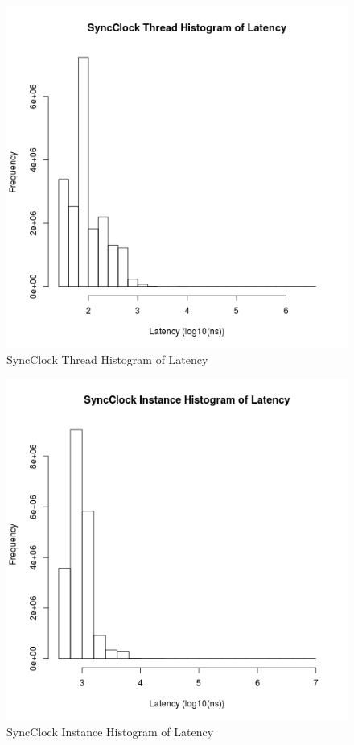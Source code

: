 \begin{figure}[H]
\center
\includegraphics[height=.4\textheight]{sync_thread_latency_hist.png}
\caption{SyncClock Thread Histogram of Latency}
\label{sync_thread_latency}
\end{figure}

\begin{figure}[H]
\center
\includegraphics[height=.4\textheight]{sync_instance_latency_hist.png}
\caption{SyncClock Instance Histogram of Latency}
\label{sync_instance_latency}
\end{figure}

